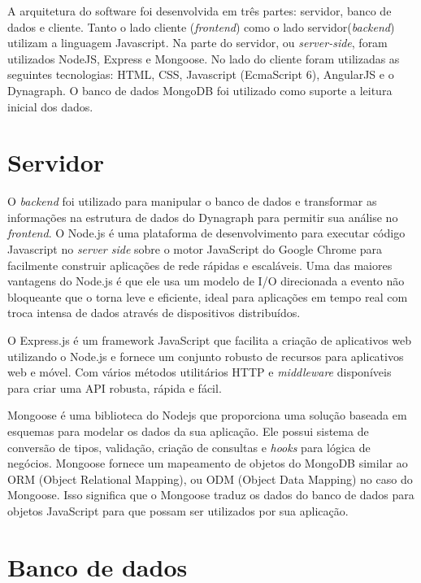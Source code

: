 \label{ap:tecnologias}

A arquitetura do software foi desenvolvida em três partes: servidor, banco de dados e cliente. Tanto o lado cliente (\textit{frontend}) como o lado servidor(\textit{backend})
utilizam a linguagem Javascript.
Na parte do servidor, ou \textit{server-side}, foram utilizados NodeJS, Express e Mongoose. No lado do cliente foram utilizadas as seguintes tecnologias:
HTML, CSS, Javascript (EcmaScript 6), AngularJS e o Dynagraph. O banco de dados MongoDB foi utilizado como suporte a leitura inicial dos dados.


\section{Servidor}
O \textit{backend} foi utilizado para manipular o banco de dados e transformar as informações na estrutura de dados do Dynagraph para permitir sua análise no \textit{frontend}.
O Node.js é uma plataforma de desenvolvimento para executar código Javascript no \textit{server side} sobre o motor JavaScript do Google Chrome para facilmente construir aplicações de rede rápidas e escaláveis. Uma das maiores vantagens do Node.js é que ele usa um modelo de I/O direcionada a evento não bloqueante que o torna leve e eficiente, ideal para aplicações em tempo real com troca intensa de dados através de dispositivos distribuídos.

O Express.js é um framework JavaScript que facilita a criação de aplicativos web utilizando o Node.js e fornece um conjunto robusto de recursos para aplicativos web e móvel. Com vários métodos utilitários HTTP e \textit{middleware} disponíveis para criar uma API robusta, rápida e fácil. 

Mongoose é uma biblioteca do Nodejs que proporciona uma solução baseada em esquemas para modelar os dados da sua aplicação. Ele possui sistema de conversão de tipos, validação, criação de consultas e \textit{hooks} para lógica de negócios. Mongoose fornece um mapeamento de objetos do MongoDB similar ao ORM (Object Relational Mapping), ou ODM (Object Data Mapping) no caso do Mongoose. Isso significa que o Mongoose traduz os dados do banco de dados para objetos JavaScript para que possam ser utilizados por sua aplicação.

\section{Banco de dados}

